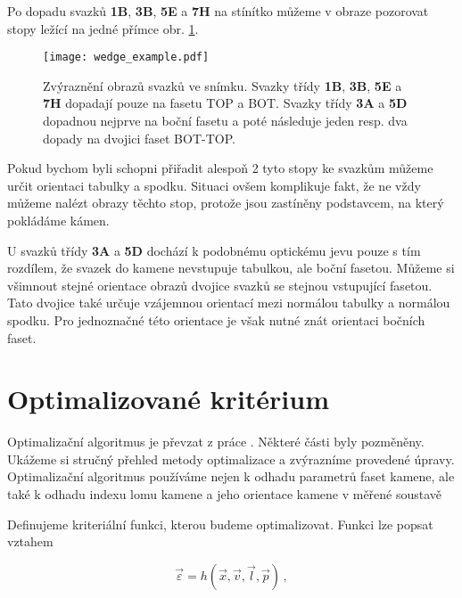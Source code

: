 Po dopadu svazků \textbf{1B}, \textbf{3B}, \textbf{5E} a \textbf{7H} na stínítko můžeme v obraze pozorovat stopy ležící na jedné přímce obr. \ref{fig:wedge_example_image}. 

\begin{figure} [h!]
\centering
\texttt{[image: wedge\_example.pdf]}
\caption{Zvýraznění obrazů svazků ve snímku. Svazky třídy \textbf{1B}, \textbf{3B}, \textbf{5E} a \textbf{7H} dopadají pouze na fasetu TOP a BOT. Svazky třídy \textbf{3A} a \textbf{5D} dopadnou nejprve na boční fasetu a poté následuje jeden resp. dva dopady na dvojici faset BOT-TOP.}
\label{fig:wedge_example_image}
\end{figure}

 Pokud bychom byli schopni přiřadit alespoň 2 tyto stopy ke svazkům můžeme určit orientaci tabulky a spodku. Situaci ovšem komplikuje fakt, že ne vždy můžeme nalézt obrazy těchto stop, protože jsou zastíněny podstavcem, na který pokládáme kámen. 
 
 U svazků třídy \textbf{3A} a \textbf{5D} dochází k podobnému optickému jevu pouze s tím rozdílem, že svazek do kamene nevstupuje tabulkou, ale boční fasetou. Můžeme si všimnout stejné orientace obrazů dvojice svazků se stejnou vstupující fasetou. Tato dvojice také určuje vzájemnou orientací mezi normálou tabulky a normálou spodku. Pro jednoznačné této orientace je však nutné znát orientaci bočních faset.   

\section{Optimalizované kritérium}
\label{sec:Optimalizace_crit}
Optimalizační algoritmus je převzat z práce \cite{Bodlak2005}. Některé části byly pozměněny. Ukážeme si stručný přehled metody optimalizace a zvýrazníme provedené úpravy. Optimalizační algoritmus používáme nejen k odhadu parametrů faset kamene, ale také k odhadu indexu lomu kamene a jeho orientace kamene v měřené soustavě 

Definujeme kriteriální funkci, kterou budeme optimalizovat. Funkci lze popsat vztahem 

\begin{equation}
\vec{\varepsilon} = h\left(\vec{x},\vec{v},\vec{l},\vec{p} \right)\,,
\end{equation}

